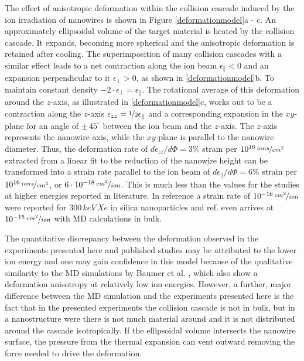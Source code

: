 \begin{Figure}[h]
The effect of anisotropic deformation within the collision cascade induced by the ion irradiation of nanowires is shown in Figure \ref{deformationmodel}a - c. An approximately ellipsoidal volume of the target material is heated by the collision cascade. It expands, becoming more spherical and the anisotropic deformation is retained after cooling. The superimposition of many collision cascades with a similar effect leads to a net contraction along the ion beam $\epsilon_{\parallel} < 0$ and an expansion perpendicular to it $\epsilon_{\perp} > 0$, as shown in \ref{deformationmodel}b. To maintain constant density $-2\cdot\epsilon_{\perp} =  \epsilon_{\parallel}$. The rotational average of this deformation around the $z$-axis, as illustrated in \ref{deformationmodel}c, works out to be a contraction along the $z$-axis $\epsilon_{zz} = \nicefrac{1}{2} \epsilon_{\parallel}$ and a corresponding expansion in the $xy$-plane for an angle of $\pm\, 45^\circ$ between the ion beam and the $z$-axis. The $z$-axis represents the nanowire axis, while the $xy$-plane is parallel to the nanowire diameter. Thus, the deformation rate of $d\epsilon_{zz}/d\Phi = 3\%$ strain per $10^{16}\,\nicefrac{ions}{cm^2}$ extracted from a linear fit to the reduction of the nanowire height can be transformed into a strain rate parallel to the ion beam of $d\epsilon_{\parallel}/d\Phi = 6\%$ strain per $10^{16}\,\nicefrac{ions}{cm^2}$, or $6\cdot 10^{-18}\,\nicefrac{cm^2}{ion}$. This is much less than the values for the studies at higher energies reported in literature. In reference \cite{dillen_ion_2003} a strain rate of $10^{-16}\,\nicefrac{cm^2}{ion}$ were reported for $300\,keV\,Xe$ in silica nanoparticles and ref. \cite{baumer_prediction_2014} even arrives at $10^{-15}\,\nicefrac{cm^2}{ion}$ with MD calculations in bulk. 

The quantitative discrepancy between the deformation observed in the experiments presented here and published studies may be attributed to the lower ion energy and one may gain confidence in this model because of the qualitative similarity to the MD simulations by Baumer et al. \cite{baumer_prediction_2014}, which also show a deformation anisotropy at relatively low ion energies. However, a further, major difference between the MD simulation and the experiments presented here is the fact that in the presented experiments the collision cascade is not in bulk, but in a nanostructure were there is not much material around and it is not distributed around the cascade isotropically. If the ellipsoidal volume intersects the nanowire surface, the pressure from the thermal expansion can vent outward removing the force needed to drive the deformation.


\end{Figure}
